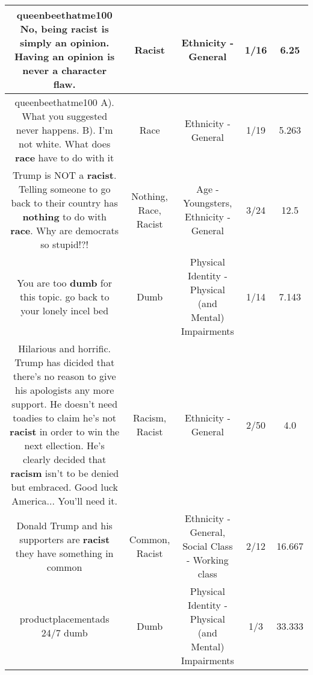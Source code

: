 \documentclass[11pt]{article}
\newlength\mylength
\begin{document}
\begin{center}
\begin{longtable}{|C{.65\mylength}|C{.30\mylength}|C{.12\mylength}|C{.12\mylength}|C{.12\mylength}|}
  \small queenbeethatme100 No, being \textbf{racist} is simply an opinion.  Having an opinion is never a character flaw.\normalsize   & Racist & Ethnicity - General & 1/16 & 6.25 \\  \hline
  \small queenbeethatme100 A). What you suggested never happens.  B). I'm not white.  What does \textbf{race} have to do with it\normalsize   & Race & Ethnicity - General & 1/19 & 5.263 \\  \hline
  \small Trump is NOT a \textbf{racist}. Telling someone to go back to their country has \textbf{nothing} to do with \textbf{race}. Why are democrats so stupid!?!\normalsize   & Nothing, Race, Racist & Age - Youngsters, Ethnicity - General & 3/24 & 12.5 \\  \hline
  \small You are too \textbf{dumb} for this topic. go back to your lonely incel bed\normalsize   & Dumb & Physical Identity - Physical (and Mental) Impairments & 1/14 & 7.143 \\  \hline
  \small Hilarious and horrific. Trump has dicided that there's no reason to give his apologists any more support. He doesn't need toadies to claim he's not \textbf{racist} in order to win the next ellection. He's clearly decided that \textbf{racism} isn't to be denied but embraced. Good luck America... You'll need it.\normalsize   & Racism, Racist & Ethnicity - General & 2/50 & 4.0 \\  \hline
  \small Donald Trump and his supporters are \textbf{racist} they have something in common\normalsize   & Common, Racist & Ethnicity - General, Social Class - Working class & 2/12 & 16.667 \\  \hline
  \small productplacementads 24/7 dumb\normalsize   & Dumb & Physical Identity - Physical (and Mental) Impairments & 1/3 & 33.333 \\  \hline

\end{longtable}
\end{center}
\end{document}
